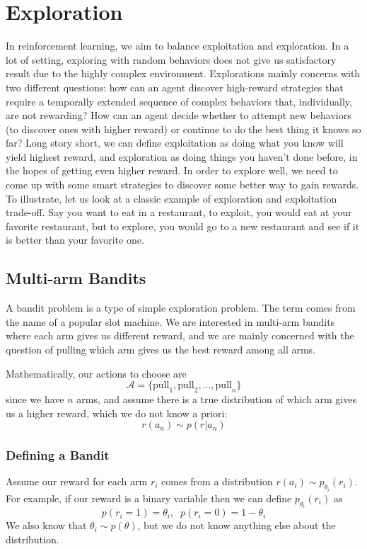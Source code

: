 \chapter{Exploration}
In reinforcement learning, we aim to balance exploitation and exploration. In a lot of setting, exploring with random behaviors does not give us satisfactory result due to the highly complex environment. Explorations mainly concerns with two different questions: how can an agent discover high-reward strategies that require a temporally extended sequence of complex behaviors that, individually, are not rewarding? How can an agent decide whether to attempt new behaviors (to discover ones with higher reward) or continue to do the best thing it knows so far? Long story short, we can define exploitation as doing what you know will yield highest reward, and exploration as  doing things you haven’t done before, in the hopes of getting even higher reward. In order to explore well, we need to come up with some smart strategies to discover some better way to gain rewards. To illustrate, let us look at a classic example of exploration and exploitation trade-off. Say you want to eat in a restaurant, to exploit, you would eat at your favorite restaurant, but to explore, you would go to a new restaurant and see if it is better than your favorite one. 

\section{Multi-arm Bandits}
A bandit problem is a type of simple exploration problem. The term comes from the name of a popular slot machine. We are interested in multi-arm bandits where each arm gives us different reward, and we are mainly concerned with the question of pulling which arm gives us the best reward among all arms.

Mathematically, our actions to choose are
\[
\mathcal{A} = \{\text{pull}_1,\text{pull}_2,\dots,\text{pull}_n\}
\]
since we have $n$ arms, and assume there is a true distribution of which arm gives us a higher reward, which we do not know a priori:
\[
r(a_n)\sim p(r|a_n)
\]

\subsection{Defining a Bandit}
Assume our reward for each arm $r_i$ comes from a distribution $r(a_i)\sim p_{\theta_i}(r_i)$. For example, if our reward is a binary variable then we can define $p_{\theta_i}(r_i)$ as
\[
p(r_i=1) = \theta_i,\;\;p(r_i=0) = 1-\theta_i
\]
We also know that $\theta_i\sim p(\theta)$, but we do not know anything else about the distribution.

